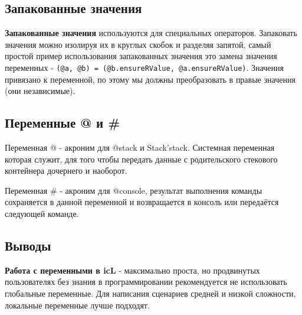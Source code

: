 \subsection{Запакованные значения}

{\bf Запакованные значения} используются для специальных операторов. Запаковать значения можно изолируя их в круглых скобок и разделяя запятой, самый простой пример использования запакованных значения это замена значения переменных - \lstinline|(@a, @b) = (@b.ensureRValue, @a.ensureRValue)|. Значения привязано к переменной, по этому мы должны преобразовать в правые значения (они независимые).

\subsection{Переменные @ и \#}

{Переменная @} - акроним для @stack и Stack'stack. Системная переменная которая служит, для того чтобы передать данные с родительского стекового контейнера дочернего и наоборот. 

{Переменная \#} - акроним для @console, результат выполнения команды сохраняется в данной переменной и возвращается в консоль или передаётся следующей команде.

\subsection{Выводы}

{\bf Работа с переменными в icL} - максимально проста, но продвинутых пользователях без знания в программировании рекомендуется не использовать глобальные переменные. Для написания сценариев средней и низкой сложности, локальные переменные лучше подходят.
